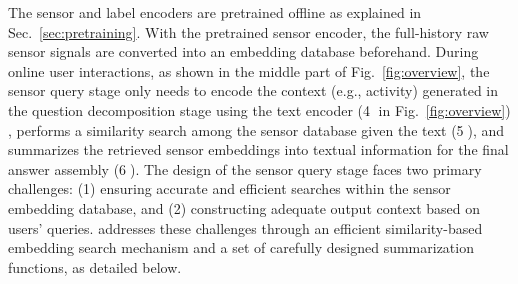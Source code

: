 



The sensor and label encoders are pretrained offline as explained in Sec.~\ref{sec:pretraining}. 
With the pretrained sensor encoder, the full-history raw sensor signals are converted into an embedding database beforehand.
During online user interactions, as shown in the middle part of Fig.~\ref{fig:overview}, the sensor query stage only needs to encode the context (e.g., activity) generated in the question decomposition stage using the text encoder (\textcircled{4} in Fig.~\ref{fig:overview}) , performs a similarity search among the sensor database given the text (\textcircled{5}), and summarizes the retrieved sensor embeddings into textual information for the final answer assembly (\textcircled{6}).
The design of the sensor query stage faces two primary challenges: (1) ensuring accurate and efficient searches within the sensor embedding database, and (2) constructing adequate output context based on users' queries. 
\Method addresses these challenges through an efficient similarity-based embedding search mechanism and a set of carefully designed summarization functions, as detailed below.






